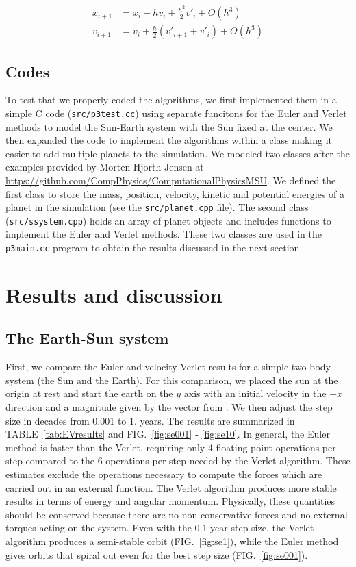 \documentclass[10pt,showpacs,preprintnumbers,footinbib,amsmath,amssymb,aps,prl,twocolumn,groupedaddress,superscriptaddress,showkeys]{revtex4-1}
\begin{document}
\begin{align}
	x_{i+1} &= x_i + hv_i + \frac{h^2}{2} v'_i + O(h^3)\\
	v_{i+1} &= v_i + \frac{h}{2}(v'_{i+1} + v'_i) + O(h^3)
\label{eq:Verlet}
\end{align}

\subsection*{Codes}

To test that we properly coded the algorithms, we first implemented them
in a simple C code (\texttt{src/p3test.cc}) using separate funcitons for the
Euler and Verlet methods to model the Sun-Earth system with the Sun fixed
at the center. We then expanded the code to implement the algorithms
within a class making it easier to add multiple planets to the simulation. We
modeled two classes after the examples provided by Morten Hjorth-Jensen
at \url{https://github.com/CompPhysics/ComputationalPhysicsMSU}. We
defined the first class to store the mass, position, velocity, kinetic and potential
energies of a planet in the simulation (see the \texttt{src/planet.cpp} file). The
second class (\texttt{src/ssystem.cpp}) holds an array of planet objects and
includes functions to implement the Euler and Verlet methods. These two
classes are used in the \texttt{p3main.cc} program to obtain the results
discussed in the next section.


\section{Results and discussion}

\subsection*{The Earth-Sun system}

First, we compare the Euler and velocity Verlet results for a simple two-body
system (the Sun and the Earth). For this comparison, we placed the sun at
the origin at rest and start the earth on the $y$ axis with an initial velocity
in the $-x$ direction and a magnitude given by the vector from \citep{nasa}.
We then adjust the step size in decades from 0.001 to 1. years. The results
are summarized in TABLE~\ref{tab:EVresults} and FIG.~\ref{fig:se001} - 
\ref{fig:se10}. In general, the Euler method is faster than the Verlet,
requiring only 4 floating point operations per step compared to the 6
operations per step needed by the Verlet algorithm. These estimates exclude
the operations necessary to compute the forces which are carried out in an
external function. The Verlet algorithm produces more stable results in terms
of energy and angular momentum. Physically, these quantities should be
conserved because there are no non-conservative forces and no external
torques acting on the system. Even with the 0.1 year step size, the
Verlet algorithm produces a semi-stable orbit (FIG.~\ref{fig:se1}), while
the Euler method gives orbits that spiral out even for the best step size
(FIG.~\ref{fig:se001}).
\end{document}
